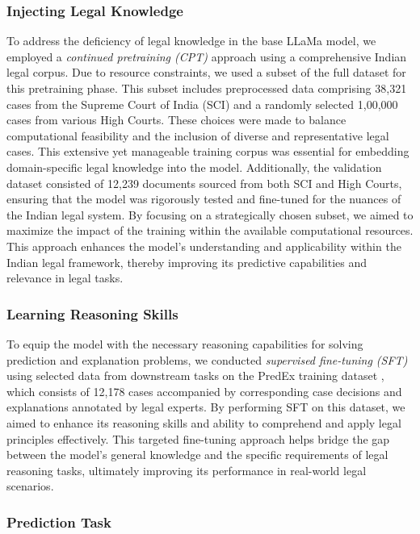 \subsubsection{Injecting Legal Knowledge}
To address the deficiency of legal knowledge in the base LLaMa model, we employed a \emph{continued pretraining (CPT)} approach using a comprehensive Indian legal corpus. Due to resource constraints, we used a subset of the full \texttt{\named} dataset for this pretraining phase. This subset includes preprocessed data comprising 38,321 cases from the Supreme Court of India (SCI) and a randomly selected 1,00,000 cases from various High Courts. These choices were made to balance computational feasibility and the inclusion of diverse and representative legal cases. This extensive yet manageable training corpus was essential for embedding domain-specific legal knowledge into the model. Additionally, the validation dataset consisted of 12,239 documents sourced from both SCI and High Courts, ensuring that the model was rigorously tested and fine-tuned for the nuances of the Indian legal system. By focusing on a strategically chosen subset, we aimed to maximize the impact of the training within the available computational resources. This approach enhances the model's understanding and applicability within the Indian legal framework, thereby improving its predictive capabilities and relevance in legal tasks.


\subsubsection{Learning Reasoning Skills}
To equip the model with the necessary reasoning capabilities for solving prediction and explanation problems, we conducted \emph{supervised fine-tuning (SFT)} using selected data from downstream tasks on the PredEx training dataset \cite{nigam2024legaljudgmentreimaginedpredex}, which consists of 12,178 cases accompanied by corresponding case decisions and explanations annotated by legal experts. By performing SFT on this dataset, we aimed to enhance its reasoning skills and ability to comprehend and apply legal principles effectively. This targeted fine-tuning approach helps bridge the gap between the model's general knowledge and the specific requirements of legal reasoning tasks, ultimately improving its performance in real-world legal scenarios.

\subsubsection{Prediction Task}

